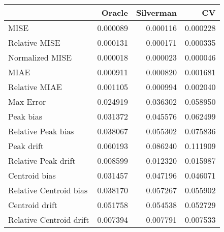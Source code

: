 \begin{tabular}{lrrr}
  \hline
 & Oracle & Silverman & CV \\ 
  \hline
MISE & 0.000089 & 0.000116 & 0.000228 \\ 
  Relative MISE & 0.000131 & 0.000171 & 0.000335 \\ 
  Normalized MISE & 0.000018 & 0.000023 & 0.000046 \\ 
  MIAE & 0.000911 & 0.000820 & 0.001681 \\ 
  Relative MIAE & 0.001105 & 0.000994 & 0.002040 \\ 
  Max Error & 0.024919 & 0.036302 & 0.058950 \\ 
  Peak bias & 0.031372 & 0.045576 & 0.062499 \\ 
  Relative Peak bias & 0.038067 & 0.055302 & 0.075836 \\ 
  Peak drift & 0.060193 & 0.086240 & 0.111909 \\ 
  Relative Peak drift & 0.008599 & 0.012320 & 0.015987 \\ 
  Centroid bias & 0.031457 & 0.047196 & 0.046071 \\ 
  Relative Centroid bias & 0.038170 & 0.057267 & 0.055902 \\ 
  Centroid drift & 0.051758 & 0.054538 & 0.052729 \\ 
  Relative Centroid drift & 0.007394 & 0.007791 & 0.007533 \\ 
   \hline
\end{tabular}
